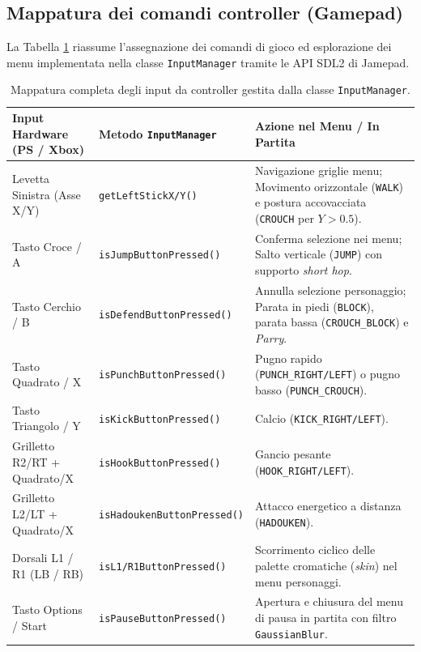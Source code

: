 \documentclass[11pt, a4paper]{article}
\begin{document}
	\subsection{Mappatura dei comandi controller (Gamepad)}
	La Tabella \ref{tab:controls} riassume l'assegnazione dei comandi di gioco ed esplorazione dei menu implementata nella classe \texttt{InputManager} tramite le API SDL2 di Jamepad.
	
	\begin{table}[htbp]
		\centering
		\begin{tabularx}{\textwidth}{l l X}
			\toprule
			\textbf{Input Hardware (PS / Xbox)} & \textbf{Metodo \texttt{InputManager}} & \textbf{Azione nel Menu / In Partita} \\
			\midrule
			Levetta Sinistra (Asse X/Y) & \texttt{getLeftStickX/Y()} & Navigazione griglie menu; Movimento orizzontale (\texttt{WALK}) e postura accovacciata (\texttt{CROUCH} per $Y > 0.5$). \\
			Tasto Croce / A & \texttt{isJumpButtonPressed()} & Conferma selezione nei menu; Salto verticale (\texttt{JUMP}) con supporto \emph{short hop}. \\
			Tasto Cerchio / B & \texttt{isDefendButtonPressed()} & Annulla selezione personaggio; Parata in piedi (\texttt{BLOCK}), parata bassa (\texttt{CROUCH\_BLOCK}) e \emph{Parry}. \\
			Tasto Quadrato / X & \texttt{isPunchButtonPressed()} & Pugno rapido (\texttt{PUNCH\_RIGHT/LEFT}) o pugno basso (\texttt{PUNCH\_CROUCH}). \\
			Tasto Triangolo / Y & \texttt{isKickButtonPressed()} & Calcio (\texttt{KICK\_RIGHT/LEFT}). \\
			Grilletto R2/RT + Quadrato/X & \texttt{isHookButtonPressed()} & Gancio pesante (\texttt{HOOK\_RIGHT/LEFT}). \\
			Grilletto L2/LT + Quadrato/X & \texttt{isHadoukenButtonPressed()} & Attacco energetico a distanza (\texttt{HADOUKEN}). \\
			Dorsali L1 / R1 (LB / RB) & \texttt{isL1/R1ButtonPressed()} & Scorrimento ciclico delle palette cromatiche (\emph{skin}) nel menu personaggi. \\
			Tasto Options / Start & \texttt{isPauseButtonPressed()} & Apertura e chiusura del menu di pausa in partita con filtro \texttt{GaussianBlur}. \\
			\bottomrule
		\end{tabularx}
		\caption{Mappatura completa degli input da controller gestita dalla classe \texttt{InputManager}.}
		\label{tab:controls}
	\end{table}
	
\end{document}
